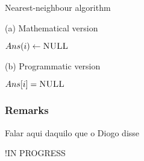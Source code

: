 \begin{center}
    \begin{algorithm}[ht]
        \caption{Nearest-neighbour algorithm}
        \label{alg:nearest neighbour}
        \begin{minipage}[t]{0.49\linewidth}
            (a) Mathematical version
            \begin{algorithmic}[1]
                     {$Ans(i) \gets \textsc{NULL}$}
                    \EndFor
                    \EndFor
                    \State {}
                \EndFunction
            \end{algorithmic}
        \end{minipage}
        \begin{minipage}[t]{0.49\linewidth}
            (b) Programmatic version
            \begin{algorithmic}[1]
                     {$Ans[i] = \textsc{NULL}$}
                    \EndFor
                            \EndIf
                        \EndFor
                    \EndFor
                    \State {}
                \EndFunction
            \end{algorithmic}
        \end{minipage}
    \end{algorithm}
\end{center}

\subsubsection{Remarks}
Falar aqui daquilo que o Diogo disse


\par
!IN PROGRESS
